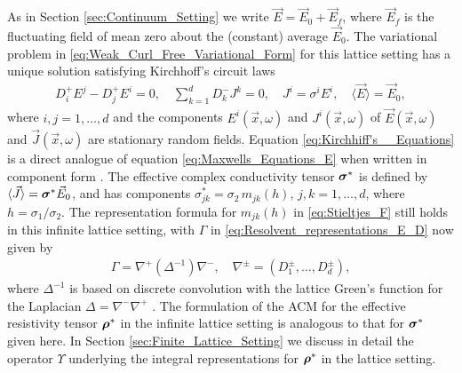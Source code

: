 \documentclass{cmslatex}
\newcommand\bsig{\mbox{\boldmath${\sigma}$}}
\newcommand\brho{\mbox{\boldmath${\rho}$}}
\begin{document}
As in Section \ref{sec:Continuum_Setting} we write
$\vec{E}=\vec{E}_0+\vec{E}_f$, where $\vec{E}_f$ is the fluctuating
field of mean zero about the (constant) average $\vec{E}_0$. 
The variational problem in \eqref{eq:Weak_Curl_Free_Variational_Form}
for this lattice setting has a unique solution satisfying Kirchhoff's
circuit laws \cite{Golden:CMP-473,Bruno:JSP-365}      
%
\begin{align}\label{eq:Kirchhiff's__Equations}
  D_i^+E^j-D_j^+E^i=0, \quad
  \sum_{k=1}^dD_k^-J^k=0, \quad
  J^i=\sigma^iE^i, \quad
  \langle\vec{E}\rangle=\vec{E}_0,
\end{align}
%
where $i,j=1,\ldots,d$ and the components $E^i(\vec{x},\omega)$ and
$J^i(\vec{x},\omega)$ of $\vec{E}(\vec{x},\omega)$ and $\vec{J}(\vec{x},\omega)$ are
stationary random fields.  
Equation \eqref{eq:Kirchhiff's__Equations} is a direct analogue of
equation \eqref{eq:Maxwells_Equations_E} when written in component
form \cite{Golden:CMP-473}. The effective complex 
conductivity tensor $\bsig^*$ is defined by
$\langle\vec{J}\rangle=\bsig^*\vec{E}_0$, and has components
$\sigma^*_{jk}=\sigma_2\,m_{jk}(h)$, $j,k=1,\ldots,d$, where $h=\sigma_1/\sigma_2$. The
representation formula for $m_{jk}(h)$ in \eqref{eq:Stieltjes_F}
still holds in this infinite lattice setting,  
with $\Gamma$ in \eqref{eq:Resolvent_representations_E_D} now given by 
%
\begin{align}\label{eq:Discrete_Gamma}
  \Gamma=\nabla^+(\Delta^{-1})\nabla^-, \quad \nabla^\pm = (D_1^\pm,\ldots,D_d^\pm),
\end{align}
%
where $\Delta^{-1}$ is based on discrete convolution with the lattice
Green's function for the Laplacian $\Delta=\nabla^-\nabla^+$ \cite{Bruno:JSP-365}. The
formulation of the ACM for the effective resistivity tensor $\brho^*$
in the infinite lattice setting is analogous to that for $\bsig^*$
given here. In Section \ref{sec:Finite_Lattice_Setting} we discuss in
detail the operator $\Upsilon$ underlying the integral representations for
$\brho^*$ in the lattice setting. 
\end{document}
